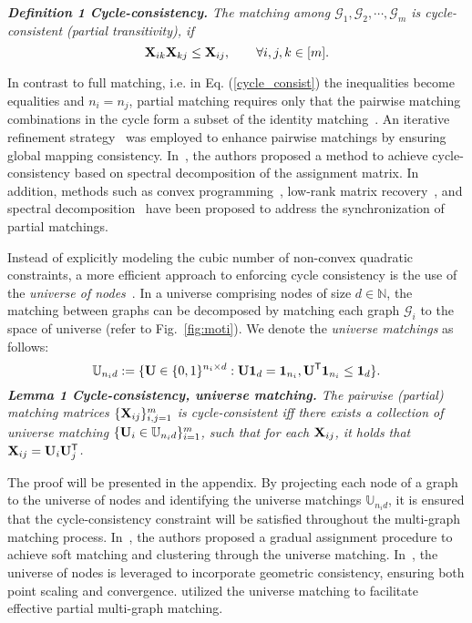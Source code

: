 \noindent \textit{\textbf{Definition 1 Cycle-consistency.} The matching among $\mathcal{G}_1, \mathcal{G}_2, \cdots, \mathcal{G}_m$ is cycle-consistent (partial transitivity), if }
\begin{equation}
\label{cycle_consist}
    \bold{X}_{ik}\bold{X}_{kj} \leq \bold{X}_{ij}, \qquad \forall{i,j,k\in [m]}.
\end{equation}

In contrast to full matching, i.e. in Eq. (\ref{cycle_consist}) the inequalities become equalities and $n_i = n_j$, partial matching requires only that the pairwise matching combinations in the cycle form a subset of the identity matching~\cite{bernard2019synchronisation}. 
An iterative refinement strategy~\cite{nguyen2011optimization} was employed to enhance pairwise matchings by ensuring global mapping consistency. In~\cite{pachauri2013solving}, the authors proposed a method to achieve cycle-consistency based on spectral decomposition of the assignment matrix. In addition, methods such as convex programming~\cite{chen2014near}, low-rank matrix recovery~\cite{zhou2015multi}, and spectral decomposition~\cite{maset2017practical} have been proposed to address the synchronization of partial matchings.

Instead of explicitly modeling the cubic number of non-convex quadratic constraints, a more efficient approach to enforcing cycle consistency is the use of the \textit{universe of nodes}~\cite{tron2017fast}. In a universe comprising nodes of size $d \in \mathbb{N}$, the matching between graphs can be decomposed by matching each graph $\mathcal{G}_i$ to the space of universe (refer to Fig.~\ref{fig:moti}). We denote the \textit{universe matchings} as follows:
\begin{equation}
    \mathbb{U}_{n_id} := \{ \bold{U} \in \{0,1\}^{n_i\times d}: \bold{U}\bold{1}_d=\bold{1}_{n_i}, \bold{U}^{\mathsf{T}}\bold{1}_{n_i} \leq \bold{1}_d \}.
\end{equation}
 \noindent \textit{\textbf{Lemma 1 Cycle-consistency, universe matching.} \label{lemma1} The pairwise (partial) matching matrices $\{ \bold{X}_{ij}\}_{i,j=1}^{m} $ is cycle-consistent iff there exists a collection of universe matching $\{ \bold{U}_i \in \mathbb{U}_{n_id} \}_{i=1}^{m}$, such that for each $\bold{X}_{ij}$, it holds that $\bold{X}_{ij} = \bold{U}_i \bold{U}_{j}^{\mathsf{T}}$. }

The proof will be presented in the appendix. By projecting each node of a graph to the universe of nodes and identifying the universe matchings $\mathbb{U}_{n_id}$, it is ensured that the cycle-consistency constraint will be satisfied throughout the multi-graph matching process. In~\cite{wang2020graduated,wang2023unsupervised}, the authors proposed a gradual assignment procedure to achieve soft matching and clustering through the universe matching. In~\cite{bernard2019hippi}, the universe of nodes is leveraged to incorporate geometric consistency, ensuring both point scaling and convergence. \cite{nurlanov2023universe} utilized the universe matching to facilitate effective partial multi-graph matching.

